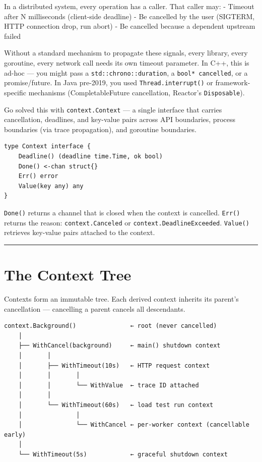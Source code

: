 \documentclass[11pt,a4paper,oneside]{book}
\begin{document}
In a distributed system, every operation has a caller. That caller may:
- Timeout after N milliseconds (client-side deadline) - Be cancelled by
the user (SIGTERM, HTTP connection drop, run abort) - Be cancelled
because a dependent upstream failed

Without a standard mechanism to propagate these signals, every library,
every goroutine, every network call needs its own timeout parameter. In
C++, this is ad-hoc --- you might pass a \texttt{std::chrono::duration},
a \texttt{bool*\ cancelled}, or a promise/future. In Java pre-2019, you
used \texttt{Thread.interrupt()} or framework-specific mechanisms
(CompletableFuture cancellation, Reactor's \texttt{Disposable}).

Go solved this with \texttt{context.Context} --- a single interface that
carries cancellation, deadlines, and key-value pairs across API
boundaries, process boundaries (via trace propagation), and goroutine
boundaries.

\begin{verbatim}
type Context interface {
    Deadline() (deadline time.Time, ok bool)
    Done() <-chan struct{}
    Err() error
    Value(key any) any
}
\end{verbatim}

\texttt{Done()} returns a channel that is closed when the context is
cancelled. \texttt{Err()} returns the reason: \texttt{context.Canceled}
or \texttt{context.DeadlineExceeded}. \texttt{Value()} retrieves
key-value pairs attached to the context.

\begin{center}\rule{0.5\linewidth}{0.5pt}\end{center}

\section{The Context Tree}

Contexts form an immutable tree. Each derived context inherits its
parent's cancellation --- cancelling a parent cancels all descendants.

\begin{verbatim}
context.Background()               ← root (never cancelled)
    │
    ├── WithCancel(background)     ← main() shutdown context
    │       │
    │       ├── WithTimeout(10s)   ← HTTP request context
    │       │       │
    │       │       └── WithValue  ← trace ID attached
    │       │
    │       └── WithTimeout(60s)   ← load test run context
    │               │
    │               └── WithCancel ← per-worker context (cancellable early)
    │
    └── WithTimeout(5s)            ← graceful shutdown context
\end{verbatim}
\end{document}
